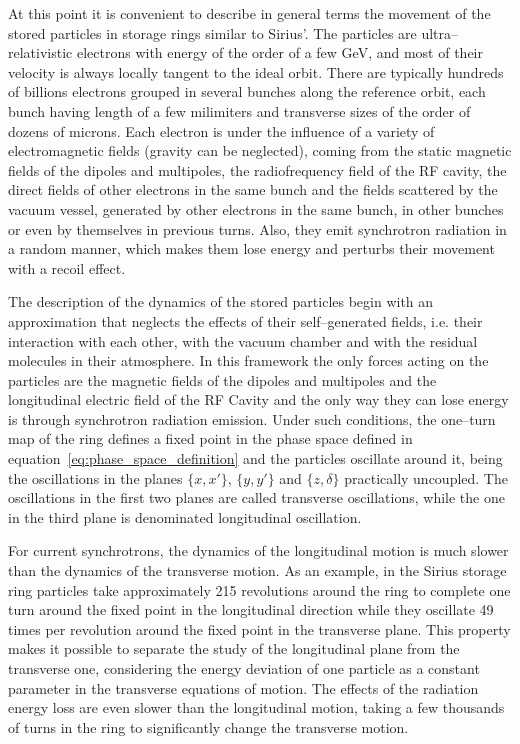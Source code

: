     At this point it is convenient to describe in general terms the movement of the stored particles in storage rings similar to Sirius'. The particles are ultra--relativistic electrons with energy of the order of a few \si{GeV}, and most of their velocity is always locally tangent to the ideal orbit. There are typically hundreds of billions electrons grouped in several bunches along the reference orbit, each bunch having length of a few milimiters and transverse sizes of the order of dozens of microns. Each electron is under the influence of a variety of electromagnetic fields (gravity can be neglected), coming from the static magnetic fields of the dipoles and multipoles, the radiofrequency field of the RF cavity, the direct fields of other electrons in the same bunch and the fields scattered by the vacuum vessel, generated by other electrons in the same bunch, in other bunches or even by themselves in previous turns. Also, they emit synchrotron radiation in a random manner, which makes them lose energy and perturbs their movement with a recoil effect.

    The description of the dynamics of the stored particles begin with an approximation that neglects the effects of their self--generated fields, i.e. their interaction with each other, with the vacuum chamber and with the residual molecules in their atmosphere. In this framework the only forces acting on the particles are the magnetic fields of the dipoles and multipoles and the longitudinal electric field of the RF Cavity and the only way they can lose energy is through synchrotron radiation emission. Under such conditions, the one--turn map of the ring defines a fixed point in the phase space defined in equation~\eqref{eq:phase_space_definition} and the particles oscillate around it, being the oscillations in the planes $\{x,x'\}$, $\{y,y'\}$ and $\{z,\delta\}$ practically uncoupled. The oscillations in the first two planes are called transverse oscillations, while the one in the third plane is denominated longitudinal oscillation.

    For current synchrotrons, the dynamics of the longitudinal motion is much slower than the dynamics of the transverse motion. As an example, in the Sirius storage ring particles take approximately 215 revolutions around the ring to complete one turn around the fixed point in the longitudinal direction while they oscillate 49 times per revolution around the fixed point in the transverse plane. This property makes it possible to separate the study of the longitudinal plane from the transverse one, considering the energy deviation of one particle as a constant parameter in the transverse equations of motion. The effects of the radiation energy loss are even slower than the longitudinal motion, taking a few thousands of turns in the ring to significantly change the transverse motion.

